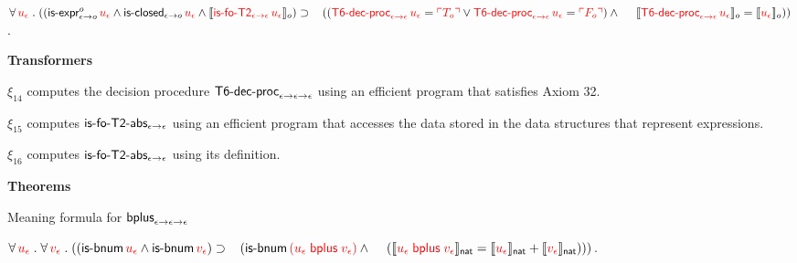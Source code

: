 \documentclass[fleqn,11pt]{article}
\begin{document}
    $\forall\, \textcolor{red}{u_\epsilon} \mathrel. 
    ((\mbox{\sf is-expr}_{\epsilon \rightarrow o}^{o} \, 
    \textcolor{red}{u_\epsilon}  \wedge
    \mbox{\sf is-closed}_{\epsilon \rightarrow o} \, \textcolor{red}{u_\epsilon} \wedge 
    \llbracket\textcolor{red}{\mbox{\sf is-fo-T2}_{\epsilon \rightarrow \epsilon} \, 
    u_\epsilon}\rrbracket_o) \supset {}\\
    \hspace*{2ex}((\textcolor{red}{\mbox{\sf T6-dec-proc}_{\epsilon \rightarrow \epsilon} \, u_\epsilon} = 
    \textcolor{red}{\ulcorner T_o\urcorner} \vee 
    \textcolor{red}{\mbox{\sf T6-dec-proc}_{\epsilon \rightarrow \epsilon} \, u_\epsilon} = 
    \textcolor{red}{\ulcorner F_o\urcorner}) \wedge {}\\
    \hspace*{3.1ex}
    \llbracket\textcolor{red}{\mbox{\sf T6-dec-proc}_{\epsilon \rightarrow \epsilon} \, u_\epsilon}\rrbracket_o =
    \llbracket\textcolor{red}{u_\epsilon}\rrbracket_o))$.

  \ee

  \item[] \textbf{Transformers}

  \be

    \setcounter{enumi}{13}

    \item $\xi_{14}$ computes the decision procedure
      $\mbox{\sf T6-dec-proc}_{\epsilon \rightarrow \epsilon \rightarrow
      \epsilon}$ using an efficient program that satisfies
      Axiom 32.


    \item $\xi_{15}$ computes $\mbox{\sf is-fo-T2-abs}_{\epsilon \rightarrow
      \epsilon}$ using an efficient program that accesses the data
      stored in the data structures that represent expressions.

    \item $\xi_{16}$ computes $\mbox{\sf is-fo-T2-abs}_{\epsilon \rightarrow
      \epsilon}$ using its definition.

  \ee
    
  \item[] \textbf{Theorems}

    \be

      \setcounter{enumi}{2}

      \item Meaning formula for 
      $\mbox{\sf bplus}_{\epsilon \rightarrow \epsilon \rightarrow \epsilon}$

      $\forall\, \textcolor{red}{u_\epsilon} \mathrel. \forall\, \textcolor{red}{v_\epsilon} \mathrel.
      ((\mbox{\sf is-bnum} \, \textcolor{red}{u_\epsilon} \wedge \mbox{\sf is-bnum} \, \textcolor{red}{v_\epsilon}) 
      \supset {}\\
      \hspace*{2ex}(\mbox{\sf is-bnum} \, 
      \textcolor{red}{(u_\epsilon \; \mbox{\sf bplus} \; v_\epsilon)} \wedge {}\\
      \hspace*{2.8ex}(\llbracket\textcolor{red}{u_\epsilon \; \mbox{\sf bplus} \; 
      v_\epsilon}\rrbracket_{\sf nat} = 
      \llbracket\textcolor{red}{u_\epsilon}\rrbracket_{\sf nat} + \llbracket\textcolor{red}{v_\epsilon}\rrbracket_{\sf nat})))$.
\end{document}
